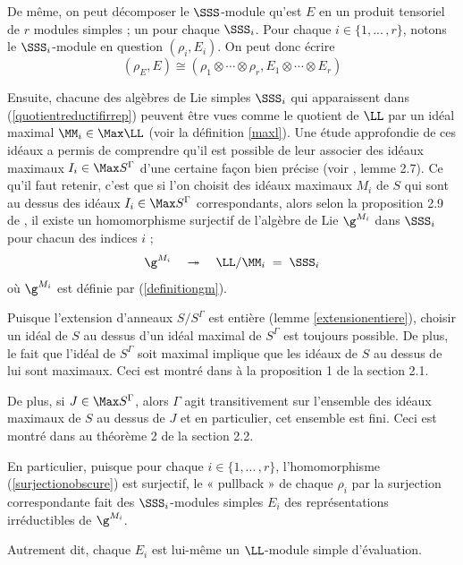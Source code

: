De même, on peut décomposer le $\SSS$-module qu'est $E$ en un produit tensoriel de $r$ modules simples ; un pour chaque $\SSS_i$. Pour chaque $i \in \{1,...\,,r\}$, notons le $\SSS_i$-module en question $(\rho_i,E_i)$. On peut donc écrire
\begin{equation} \label{modevprodtens}
(\rho_E,E) \cong (\rho_1 \otimes \cdots \otimes \rho_r, E_1 \otimes \cdots \otimes E_r)
\end{equation}

Ensuite, chacune des algèbres de Lie simples $\SSS_i$ qui apparaissent dans (\ref{quotientreductifirrep}) peuvent être vues comme le quotient de $\LL$ par un idéal maximal $\MM_i \in \Max \LL$ (voir la définition \ref{maxl}). Une étude approfondie de ces idéaux a permis de comprendre qu'il est possible de leur associer des idéaux maximaux $I_i \in \Max S^\Gamma$ d'une certaine façon bien précise (voir \cite{LauTCA}, lemme 2.7). Ce qu'il faut retenir, c'est que si l'on choisit des idéaux maximaux $M_i$ de $S$ qui sont au dessus des idéaux $I_i \in \Max S^\Gamma$ correspondants, alors selon la proposition 2.9 de \cite{LauTCA}, il existe un homomorphisme surjectif de l'algèbre de Lie $\g^{M_i}$ dans $\SSS_i$ pour chacun des indices $i$ ;
\begin{equation} \label{surjectionobscure}
\g^{M_i} \quad \twoheadrightarrow \quad \LL/\MM_i \; = \; \SSS_i
\end{equation}
où $\g^{M_i}$ est définie par (\ref{definitiongm}).

\begin{Rem} Puisque l'extension d'anneaux $S/S^\Gamma$ est entière (lemme \ref{extensionentiere}), choisir un idéal de $S$ au dessus d'un idéal maximal de $S^\Gamma$ est toujours possible. De plus, le fait que l'idéal de $S^\Gamma$ soit maximal implique que les idéaux de $S$ au dessus de lui sont maximaux. Ceci est montré dans \cite{Bourbakialgcomm} à la proposition 1 de la section 2.1.

De plus, si $J \in \Max S^\Gamma$, alors $\Gamma$ agit transitivement sur l'ensemble des idéaux maximaux de $S$ au dessus de $J$ et en particulier, cet ensemble est fini. Ceci est montré dans \cite{Bourbakialgcomm} au théorème 2 de la section 2.2.
\end{Rem}

\begin{Rem} En particulier, puisque pour chaque $i \in \{1,...\,,r\}$, l'homomorphisme \linebreak (\ref{surjectionobscure}) est surjectif, le « pullback » de chaque $\rho_i$ par la surjection correspondante fait des $\SSS_i$-modules simples $E_i$ des représentations irréductibles de $\g^{M_i}$.

Autrement dit, chaque $E_i$ est lui-même un $\LL$-module simple d'évaluation.
\end{Rem}

